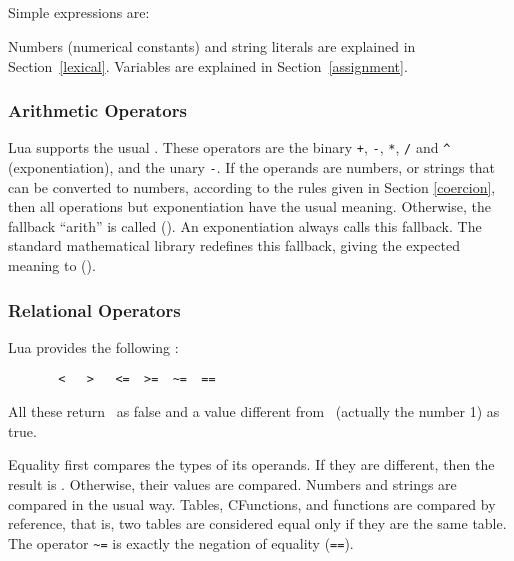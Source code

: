 \subsection{}

\subsubsection{}
Simple expressions are:
\begin{Produc}
\end{Produc}%
Numbers (numerical constants) and
string literals are explained in Section~\ref{lexical}.
Variables are explained in Section~\ref{assignment}.

\subsubsection{Arithmetic Operators}
Lua supports the usual .
These operators are the binary
\verb'+', \verb'-', \verb'*', \verb'/' and \verb'^' (exponentiation),
and the unary \verb'-'.
If the operands are numbers, or strings that can be converted to
numbers, according to the rules given in Section \ref{coercion},
then all operations but exponentiation have the usual meaning.
Otherwise, the fallback ``arith'' is called ().
An exponentiation always calls this fallback.
The standard mathematical library redefines this fallback,
giving the expected meaning to 
().

\subsubsection{Relational Operators}
Lua provides the following :
\begin{verbatim}
       <   >   <=  >=  ~=  ==
\end{verbatim}
All these return \nil\ as false and a value different from \nil\
(actually the number 1) as true.

Equality first compares the types of its operands.
If they are different, then the result is \nil.
Otherwise, their values are compared.
Numbers and strings are compared in the usual way.
Tables, CFunctions, and functions are compared by reference,
that is, two tables are considered equal only if they are the same table.
The operator \verb'~=' is exactly the negation of equality (\verb'==').

